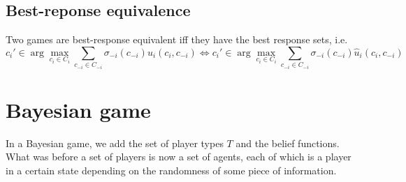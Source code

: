 \documentclass[12pt, openany]{report}
\theoremstyle{definition}
\begin{document}
\subsection{Best-reponse equivalence}
Two games are best-response equivalent iff they have the best response sets, i.e.
\begin{equation}
	c_i'\in \arg\max_{c_i\in C_i} \sum_{c_{-i}\in C_{-i}} \sigma_{-i}(c_{-i})u_i(c_i,c_{-i}) \iff c_i'\in \arg\max_{c_i\in C_i} \sum_{c_{-i}\in C_{-i}} \sigma_{-i}(c_{-i})\hat u_i(c_i,c_{-i})
\end{equation}
\section{Bayesian game}
In a Bayesian game, we add the set of player types $T$ and the belief functions. What was before a set of players is now a set of agents, each of which is a player in a certain state depending on the randomness of some piece of information.
\end{document}
